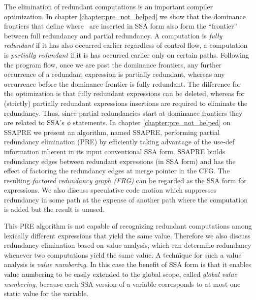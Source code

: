 The elimination of redundant computations is an important compiler
optimization. In chapter \ref{chapter:pre_not_helped} we show that the
dominance frontiers that define where \phifuns\ are inserted
in SSA form also form the ``frontier'' between full redundancy and
partial redundancy. A computation is {\em fully redundant} if it has
also occurred earlier regardless of control flow, a computation is {\em
  partially redundant} if it is has occurred earlier only on certain
paths. Following the program flow, once we are past the dominance
frontiers, any further occurrence of a redundant expression is
partially redundant, whereas any occurrence before the dominance
frontier is fully redundant. The difference for the optimization is
that fully redundant expressions can be deleted, whereas for
(strictly) partially redundant expressions insertions are required to
eliminate the redundancy. Thus, since partial redundancies start at
dominance frontiers they are related to SSA's $\phi$ statements. In
chapter \ref{chapter:pre_not_helped} on SSAPRE we present an
algorithm, named SSAPRE, performing partial redundancy elimination
(PRE) by efficiently taking advantage of the use-def information
inherent in its input conventional SSA form. SSAPRE builds redundancy
edges between redundant expressions (in SSA form) and has the effect
of factoring the redundancy edges at merge pointer in the CFG. The
resulting {\em factored redundancy graph (FRG)} can be regarded as the
SSA form for expressions. We also discuss speculative code motion
which suppresses redundancy in some path at the expense of another
path where the computation is added but the result is unused.


This PRE algorithm is not capable of recognizing redundant
computations among lexically different expressions that yield the same
value. Therefore we also discuss redundancy elimination based on value
analysis, which can determine redundancy whenever two computations
yield the same value. A technique for such a value analysis is {\em
  value numbering}. In this case the benefit of SSA form is that it
enables value numbering to be easily extended to the global scope,
called {\em global value numbering}, because each SSA version of a
variable corresponds to at most one static value for the variable.

